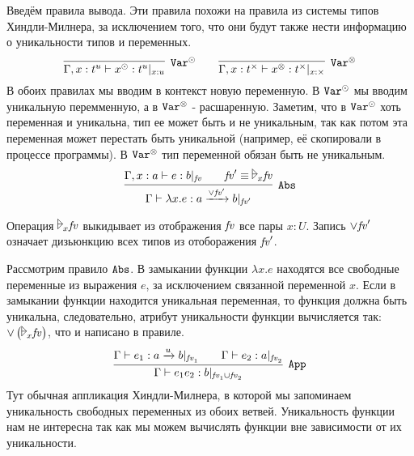 Введём правила вывода. Эти правила похожи на правила из системы типов Хиндли-Милнера,
за исключением того, что они будут также нести информацию о уникальности типов и переменных.
\[
	\infer[\ruleVarU]{\Gamma, x : t^u \vdash x^\odot : t^u |_{x:u}}{} \qquad
	\infer[\ruleVarS]{\Gamma, x : t^\times \vdash x^\otimes : t^\times |_{x:\times}}{}
\]
В обоих правилах мы вводим в контекст новую переменную.
В $\mathtt{Var^\odot}$ мы вводим уникальную перемменную, а в $\mathtt{Var^\otimes}$ - расшаренную.
Заметим, что в $\mathtt{Var^\odot}$ хоть переменная и уникальна, тип ее может быть и не уникальным,
так как потом эта переменная может перестать быть уникальной (например, её скопировали в процессе программы).
В $\mathtt{Var^\otimes}$ тип переменной обязан быть не уникальным.
\[
	\infer[\ruleAbs]
		{\Gamma \vdash \lambda x.e : a \xrightarrow{\vee \fv'} b |_{\fv'}}
		{\Gamma, x : a \vdash e : b |_{\fv} && \fv' \equiv \fuck_x \fv} \\
\]

Операция $\fuck_x \fv$ выкидывает из отображения $\mathit{fv}$ все пары $x : U$.
Запись $\vee \mathit{fv}'$ означает дизьюнкцию всех типов из отоборажения $\mathit{fv}'$.

Рассмотрим правило $\mathtt{Abs}$.
В замыкании функции $\lambda x.e$ находятся все свободные переменные из выражения $e$, за исключением связанной переменной $x$.
Если в замыкании функции находится уникальная переменная, то функция должна быть уникальна, следовательно,
атрибут уникальности функции вычисляется так: $\vee \left( \fuck_x \fv \right)$, что и написано в правиле.
\[
	\infer[\ruleApp]
		{\Gamma \vdash e_1e_2 : b |_{\fv_1 \cup \fv_2}}
		{\Gamma \vdash e_1 : a \xrightarrow{u} b |_{\fv_1} \qquad \Gamma \vdash e_2 : a |_{\fv_2}}
\]
Тут обычная аппликация Хиндли-Милнера, в которой мы запоминаем уникальность свободных переменных из обоих ветвей.
Уникальность функции нам не интересна так как мы можем вычислять функции вне зависимости от их уникальности.

